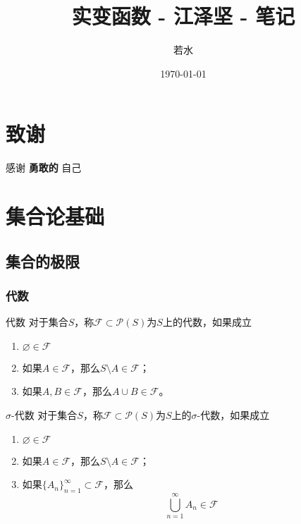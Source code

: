 \documentclass[lang = cn, scheme = chinese, thmcnt = section]{elegantbook}
\title{实变函数 - 江泽坚 - 笔记}                %
\author{若水}                        %
\date{\today}                       %
\newcommand{\sub}{\subset}             %
\begin{document}
\maketitle       %

\frontmatter     %

\chapter*{致谢}


\vspace*{\fill}
\begin{center}
	
	\large{感谢 \textbf{ 勇敢的 } 自己}
	
\end{center}
\vspace*{\fill}

\tableofcontents %

\mainmatter      %

\chapter{集合论基础}

\section{集合的极限}

\subsection{代数}

\begin{definition}{代数}
	对于集合$S$，称$\mathscr{F}\sub\mathscr{P}(S)$为$S$上的代数，如果成立
	\begin{enumerate}
		\item $\varnothing\in\mathscr{F}$
		\item 如果$A\in\mathscr{F}$，那么$S\setminus A\in\mathscr{F}$；
		\item 如果$A,B\in\mathscr{F}$，那么$A\cup B\in\mathscr{F}$。
	\end{enumerate}
\end{definition}

\begin{definition}{$\sigma$-代数}
	对于集合$S$，称$\mathscr{F}\sub\mathscr{P}(S)$为$S$上的$\sigma$-代数，如果成立
	\begin{enumerate}
		\item $\varnothing\in\mathscr{F}$
		\item 如果$A\in\mathscr{F}$，那么$S\setminus A\in\mathscr{F}$；
		\item 如果$\{ A_n \}_{n=1}^{\infty}\sub \mathscr{F}$，那么
		$$
		\bigcup_{n=1}^{\infty}{A_n}\in\mathscr{F}
		$$
	\end{enumerate}
\end{definition}
\end{document}
